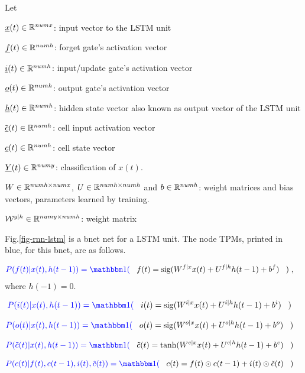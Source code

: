 Let

${\underline{x}}(t)\in { \mathbb{R}}^{numx}$: 
input vector to the LSTM unit

${\underline{f}}(t)\in { \mathbb{R}}^{numh}$:
forget gate's activation vector

${\underline{i}}(t)\in { \mathbb{R}}^{numh}$: 
input/update gate's activation vector

${\underline{o}}(t)\in { \mathbb{R}}^{numh}$: 
output gate's activation vector

${\underline{h}}(t)\in { \mathbb{R}}^{numh}$: 
hidden state vector also known as
 output vector of the LSTM unit

${\tilde {{\underline{c}}}}(t)\in { \mathbb{R}}^{numh}$: 
cell input activation vector

${\underline{c}}(t)\in { \mathbb{R}}^{numh}$: 
cell state vector

${\underline{Y}}(t)\in { \mathbb{R}}^{numy}$: 
classification of $x(t)$.

$W\in { \mathbb{R}}^{numh\times numx}$, 
$U\in { \mathbb{R}}^{numh\times numh}$
and 
$b\in { \mathbb{R}}^{numh}$: 
weight matrices and bias vectors,
 parameters learned by training.

${\cal W}^{y|h}\in { \mathbb{R}}^{numy\times numh}$:
 weight matrix


Fig.\ref{fig-rnn-lstm}
is a bnet net
for a LSTM unit.
The node TPMs, printed in blue,
for this bnet, are
as follows.

\begin{align}\color{blue}
P(f(t)|x(t), h(t-1))=\indi(\;\;\;&
f(t)=\sig(W^{f|x}x(t)+
U^{f|h}h(t-1)+b^{f})
\;\;\;)
\;,
\end{align}
where $h(-1)=0$.

\begin{align}\color{blue}
P(i(t)|x(t), h(t-1))=\indi(\;\;\;&
i(t)=\sig(W^{i|x}x(t)
+U^{i|h}h(t-1)+b^{i})
\;\;\;)
\end{align}

\begin{align}\color{blue}
P(o(t)|x(t), h(t-1))=\indi(\;\;\;&
o(t)=\sig(W^{o|x}x(t)
+U^{o|h}h(t-1)+b^{o})
\;\;\;)
\end{align}

\begin{align}\color{blue}
P(\tilde{c}(t)|x(t), h(t-1))=\indi(\;\;\;&
\tilde{c}(t)=\tanh
(W^{c|x}x(t)+U^{c|h}h(t-1)+b^{c})
\;\;\;)
\end{align}

\begin{align}\color{blue}
P(c(t)|f(t), c(t-1), i(t),
 \tilde{c}(t))
=\indi(\;\;\;&
c(t)=f(t)\odot c(t-1)+
i(t)\odot {\tilde {c}}(t)
\;\;\;)
\end{align}

